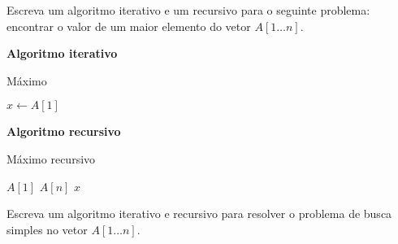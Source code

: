 \documentclass[a4paper]{memoir}
\newcommand{\un}{1 \ldots n}
\begin{document}
\newpage 

\begin{ex}
Escreva um algoritmo iterativo e um recursivo para o seguinte problema: encontrar o valor de um maior elemento do vetor $A[\un]$.
\end{ex}

\begin{sol}
\textbf{Algoritmo iterativo}

\begin{algorithm}
\caption*{Máximo}
\begin{algorithmic}[1]
\State $x \gets A[1]$
  \EndIf
\EndFor
\EndFunction
\end{algorithmic}
\end{algorithm}


\textbf{Algoritmo recursivo}

\begin{algorithm}
\caption*{Máximo recursivo}
\begin{algorithmic}[1]
    \State \Return $A[1]$
  \Else
	\State \Return $A[n]$
    \Else
	\State \Return $x$
    \EndIf
  \EndIf
\EndFunction
\end{algorithmic}
\end{algorithm}

\end{sol}

\newpage 

\begin{ex}
Escreva um algoritmo iterativo e recursivo para resolver o problema de busca simples no vetor $A[\un]$.
\end{ex}
\end{document}
